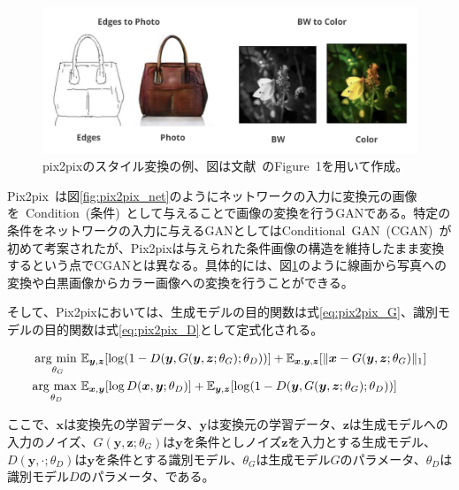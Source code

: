\begin{figure}[t]
\begin{center}
\includegraphics[width=\hsize]{figure/pix2pix_img.png}
\caption{pix2pixのスタイル変換の例、図は文献~\cite{pix2pix}のFigure~1を用いて作成。}
\label{fig:pix2pix_img}
\end{center}
\end{figure}

Pix2pix~\cite{pix2pix}は図\ref{fig:pix2pix_net}のようにネットワークの入力に変換元の画像を~Condition~(条件)~として与えることで画像の変換を行うGANである。特定の条件をネットワークの入力に与えるGANとしてはConditional~GAN~(CGAN)~\cite{CGAN}が初めて考案されたが、Pix2pixは与えられた条件画像の構造を維持したまま変換するという点でCGANとは異なる。具体的には、図\ref{fig:pix2pix_img}のように線画から写真への変換や白黒画像からカラー画像への変換を行うことができる。

そして、Pix2pixにおいては、生成モデルの目的関数は式\ref{eq:pix2pix_G}、識別モデルの目的関数は式\ref{eq:pix2pix_D}として定式化される。

\begin{align}
    \label{eq:pix2pix_G}
    \mathop{\rm arg~min~}\limits _{\theta_G}& \mathbb{E}_{\boldsymbol{y}, \boldsymbol{z}}[\log (1-D(\boldsymbol{y}, G(\boldsymbol{y}, \boldsymbol{z}; \theta_G); \theta_D))]+\mathbb{E}_{\boldsymbol{x}, \boldsymbol{y}, \boldsymbol{z}}[\|\boldsymbol{x}-G(\boldsymbol{y}, \boldsymbol{z}; \theta_G)\|_{1}]\\
    \label{eq:pix2pix_D}
    \mathop{\rm arg~max~}\limits _{\theta_D}& \mathbb{E}_{\boldsymbol{x}, \boldsymbol{y}}[\log D(\boldsymbol{x}, \boldsymbol{y}; \theta_D)]+\mathbb{E}_{\boldsymbol{y}, \boldsymbol{z}}[\log (1-D(\boldsymbol{y}, G(\boldsymbol{y}, \boldsymbol{z}; \theta_G); \theta_D))]
\end{align}

ここで、$\boldsymbol{x}$は変換先の学習データ、$\boldsymbol{y}$は変換元の学習データ、$\boldsymbol{z}$は生成モデルへの入力のノイズ、$G(\boldsymbol{y},\boldsymbol{z};\theta_G)$は$\boldsymbol{y}$を条件としノイズ$\boldsymbol{z}$を入力とする生成モデル、$D(\boldsymbol{y},\cdot;\theta_D)$は$\boldsymbol{y}$を条件とする識別モデル、$\theta_G$は生成モデル$G$のパラメータ、$\theta_D$は識別モデル$D$のパラメータ、である。

